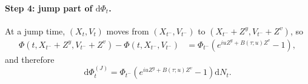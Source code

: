 \documentclass[a4paper,titlepage,12pt]{report}
\theoremstyle{plain}
\begin{document}
\paragraph{Step 4: jump part of $\mathrm{d}\Phi_t$.}
At a jump time, $(X_t,V_t)$ moves from $(X_{t^-},V_{t^-})$ to $(X_{t^-}+Z^y,V_{t^-}+Z^v)$, so
\begin{align}
\Phi(t,X_{t^-}+Z^y,V_{t^-}+Z^v)-\Phi(t,X_{t^-},V_{t^-})
&=
\Phi_{t^-}\left(e^{iuZ^y+B(\tau;u)Z^v}-1\right),
\end{align}
and therefore
\begin{equation}
\mathrm{d}\Phi_t^{(J)}
=
\Phi_{t^-}\left(e^{iuZ^y+B(\tau;u)Z^v}-1\right)\mathrm{d}N_t.
\label{eq:dPhi_jump_final}
\end{equation}

\end{document}
